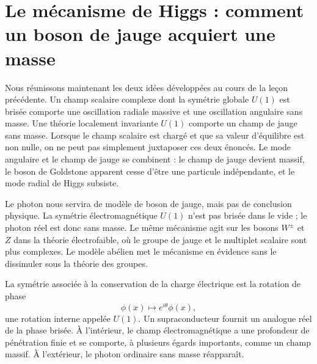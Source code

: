 \chapter{Le mécanisme de Higgs : comment un boson de jauge acquiert une masse}

Nous réunissons maintenant les deux idées développées au cours de la leçon précédente. Un champ scalaire complexe dont la symétrie globale \(U(1)\) est brisée comporte une oscillation radiale massive et une oscillation angulaire sans masse. Une théorie localement invariante \(U(1)\) comporte un champ de jauge sans masse. Lorsque le champ scalaire est chargé et que sa valeur d’équilibre est non nulle, on ne peut pas simplement juxtaposer ces deux énoncés. Le mode angulaire et le champ de jauge se combinent : le champ de jauge devient massif, le boson de Goldstone apparent cesse d’être une particule indépendante, et le mode radial de Higgs subsiste.

Le photon nous servira de modèle de boson de jauge, mais pas de conclusion physique. La symétrie électromagnétique \(U(1)\) n’est pas brisée dans le vide ; le photon réel est donc sans masse. Le même mécanisme agit sur les bosons \(W^\pm\) et \(Z\) dans la théorie électrofaible, où le groupe de jauge et le multiplet scalaire sont plus complexes. Le modèle abélien met le mécanisme en évidence sans le dissimuler sous la théorie des groupes.

\begin{classroomqa}\end{classroomqa}

La symétrie associée à la conservation de la charge électrique est la rotation de phase
\begin{equation}
  \phi(x)\longmapsto e^{i\theta}\phi(x),
\end{equation}une rotation interne appelée \(U(1)\). Un supraconducteur fournit un analogue réel de la phase brisée. À l’intérieur, le champ électromagnétique a une profondeur de pénétration finie et se comporte, à plusieurs égards importants, comme un champ massif. À l’extérieur, le photon ordinaire sans masse réapparaît.

